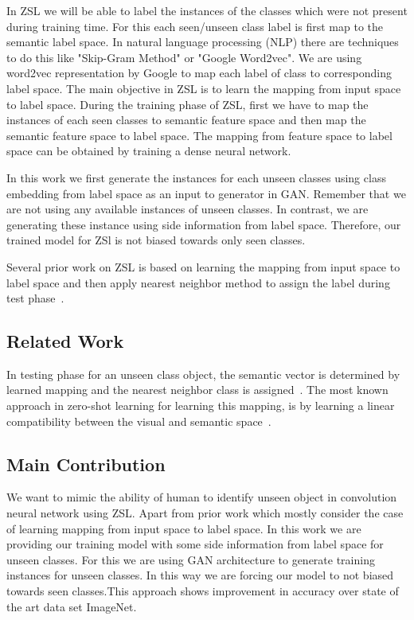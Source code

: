 \documentclass[11pt, conference, english]{IEEEtran}
\theoremstyle{plain}
\theoremstyle{definition}
\theoremstyle{remark}
\begin{document}
	
	In ZSL we will be able to label the instances of the classes which were not present during training time. For this each seen/unseen class label is first map to the semantic label space. In natural language processing (NLP) there are techniques to do this like "Skip-Gram Method" or "Google Word2vec". We are using word2vec representation by Google to  map each label of class to corresponding label space. The main objective in ZSL is to learn the mapping from input space to label space. During the training phase of ZSL, first we have to map the instances of each seen classes to semantic feature space and then map the semantic feature space to label space. The mapping from feature space to label space can be obtained by training a dense neural network.
	
	In this work we first generate the instances for each unseen classes using class embedding from label space as an input to generator in GAN. Remember that we are not using any available  instances of unseen classes. In contrast, we are generating these instance using side information from label space. Therefore, our trained model for ZSl is not biased towards only seen classes.
	
	Several prior work on ZSL is based on learning the mapping from input space to label space and then apply nearest neighbor method to assign the label during test phase~\cite{frome2013devise,lake2011one}. 
	\subsection{Related Work}
In testing phase for an unseen class
object,  the semantic vector is determined by learned mapping and the nearest
neighbor class is assigned~\cite{wang2016relational,socher2013zero}. The most known
approach in zero-shot learning for learning this mapping, is by learning a linear compatibility between the visual and semantic space~\cite{frome2013devise}.
	\subsection{Main Contribution}
	We want to mimic the ability of human to identify unseen object in convolution neural network using ZSL. Apart from prior work which mostly consider the case of learning mapping from input space to label space. In this work we are providing our training model with some side information from label space for unseen classes. For this we are using GAN architecture to generate training instances for unseen classes. In this way we are forcing our model to not biased towards seen classes.This approach shows improvement in accuracy over state of the art data set ImageNet. 
\end{document}
